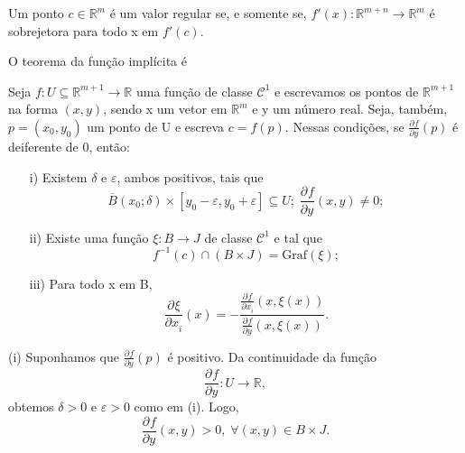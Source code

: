 \documentclass[../differential_topology.tex]{subfiles}
\begin{document}
\begin{tcolorbox}[
		skin=enhanced,
		title=Lembrete!,
		after title={\hfill Valor Regular},
		fonttitle=\bfseries,
		sharp corners=downhill,
		colframe=black,
		colbacktitle=yellow!75!white,
		colback=yellow!30,
		colbacklower=black,
		coltitle=black,
		drop large lifted shadow
	]
	Um ponto \(c\in \mathbb{R}^{m}\) é um valor regular se, e somente se, \(f'(x):\mathbb{R}^{m+n}\rightarrow \mathbb{R}^{m}\) é sobrejetora para todo x em \(f'(c).\)
\end{tcolorbox}
\begin{tcolorbox}[
		skin=enhanced,
		title=Lembrete!,
		after title={\hfill Teorema da Função Implícita},
		fonttitle=\bfseries,
		sharp corners=downhill,
		colframe=black,
		colbacktitle=yellow!75!white,
		colback=yellow!30,
		colbacklower=black,
		coltitle=black,
		drop large lifted shadow
	]
	O teorema da função implícita é
	\hypertarget{implicit_function}{
		\begin{theorem*}
			Seja \(f:U\subseteq \mathbb{R}^{m+1}\rightarrow \mathbb{R}\) uma função de classe \(\mathcal{C}^{1}\) e escrevamos os pontos de \(\mathbb{R}^{m+1}\) na forma \((x, y)\), sendo x um vetor em \(\mathbb{R}^{m}\) e y um número real. Seja, também, \(p=(x_{0}, y_{0})\) um ponto de U e escreva \(c=f(p).\) Nessas condições, se \(\frac{\partial^{}f}{\partial y^{}}(p)\) é deiferente de 0, então:
			\begin{itemize}
				\item[i)] Existem \(\delta \) e \(\varepsilon \), ambos positivos, tais que
				      \[
					      \overline{B}(x_{0}; \delta ) \times [y_{0}-\varepsilon , y_{0}+\varepsilon ] \subseteq U;\; \frac{\partial^{}f}{\partial y^{}}(x, y)\neq 0;
				      \]
				\item[ii)] Existe uma função \(\xi :B\rightarrow J\) de classe \(\mathcal{C}^{1}\) e tal que
				      \[
					      f^{-1}(c)\cap (B\times J) = \mathrm{Graf}(\xi );
				      \]
				\item[iii)] Para todo x em B,
				      \[
					      \frac{\partial^{}\xi }{\partial x_{i}^{}}(x) = -\frac{\frac{\partial^{}f}{\partial x_{i}^{}}(x, \xi (x))}{\frac{\partial^{}f}{\partial y^{}}(x, \xi (x))}.
				      \]
			\end{itemize}
		\end{theorem*}
	}
	\begin{proof*}
		(i) Suponhamos que \(\frac{\partial^{}f}{\partial y^{}}(p)\) é positivo. Da continuidade da função
		\[
			\frac{\partial^{}f}{\partial y^{}}:U\rightarrow \mathbb{R},
		\]
		obtemos \(\delta > 0 \) e \(\varepsilon  > 0\) como em (i). Logo,
		\[
			\frac{\partial^{}f}{\partial y^{}}(x, y)>0,\; \forall (x, y)\in B \times J.
		\]


\end{proof*}
\end{tcolorbox}
\end{document}
